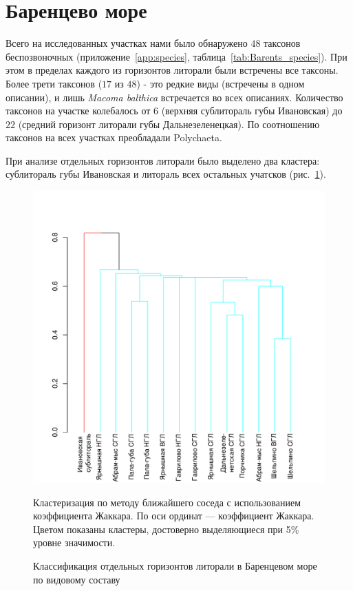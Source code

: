 \afterpage{\clearpage}

	\section{Баренцево море}

Всего на исследованных участках нами было обнаружено $48$ таксонов беспозвоночных (приложение~\ref{app:species}, таблица~\ref{tab:Barents_species}). 
При этом в пределах каждого из горизонтов литорали были встречены все таксоны. 
Более трети таксонов ($17$ из $48$) - это редкие виды (встречены в одном описании), и лишь {\it Macoma balthica} встречается во всех описаниях. 
Количество таксонов на участке колебалось от $6$ (верхняя сублитораль губы Ивановская) до $22$ (средний горизонт литорали губы Дальнезеленецкая). 
По соотношению таксонов на всех участках преобладали Polychaeta.
	

При анализе отдельных горизонтов литорали было выделено два кластера: сублитораль губы Ивановская и литораль всех остальных учатсков (рис.~\ref{ris:cluster_barents_species_tidal}). 
	\begin{figure}[p]
		\begin{center}
			\includegraphics{../Barenc_Sea/soobshestvo/Barents_fauna_tidal_jaccard_single_1.pdf}
		\end{center}
	\caption{Классификация отдельных горизонтов литорали в Баренцевом море по видовому составу}
	\label{ris:cluster_barents_species_tidal}

	\footnotesize{Кластеризация по методу ближайшего соседа с использованием коэффициента Жаккара. По оси ординат --- коэффициент Жаккара. Цветом показаны кластеры, достоверно выделяющиеся при 5\% уровне значимости.}
	\end{figure}

